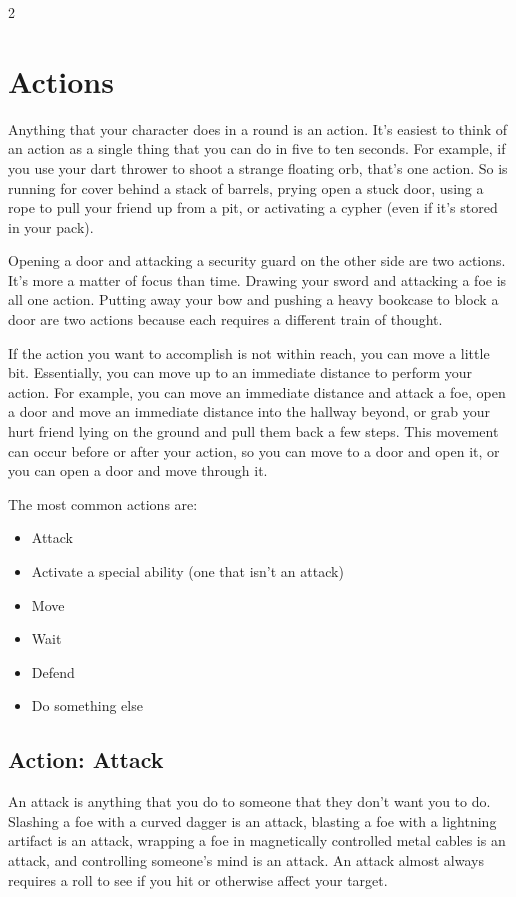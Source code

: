 \begin{multicols}{2}
\section{Actions}

Anything that your character does in a round is an action. It’s easiest to think of an action as a single thing that you can do in five to ten seconds. For example, if you use your dart thrower to shoot a strange floating orb, that’s one action. So is running for cover behind a stack of barrels, prying open a stuck door, using a rope to pull your friend up from a pit, or activating a cypher (even if it’s stored in your pack).

Opening a door and attacking a security guard on the other side are two actions. It’s more a matter of focus than time. Drawing your sword and attacking a foe is all one action. Putting away your bow and pushing a heavy bookcase to block a door are two actions because each requires a different train of thought.

If the action you want to accomplish is not within reach, you can move a little bit. Essentially, you can move up to an immediate distance to perform your action. For example, you can move an immediate distance and attack a foe, open a door and move an immediate distance into the hallway beyond, or grab your hurt friend lying on the ground and pull them back a few steps. This movement can occur before or after your action, so you can move to a door and open it, or you can open a door and move through it.

The most common actions are:

\begin{itemize} 
\item Attack
\item Activate a special ability (one that isn’t an attack)
\item Move
\item Wait
\item Defend
\item Do something else
\end{itemize}

\subsection{Action: Attack}

An attack is anything that you do to someone that they don’t want you to do. Slashing a foe with a curved dagger is an attack, blasting a foe with a lightning artifact is an attack, wrapping a foe in magnetically controlled metal cables is an attack, and controlling someone’s mind is an attack. An attack almost always requires a roll to see if you hit or otherwise affect your target.


\end{multicols}
